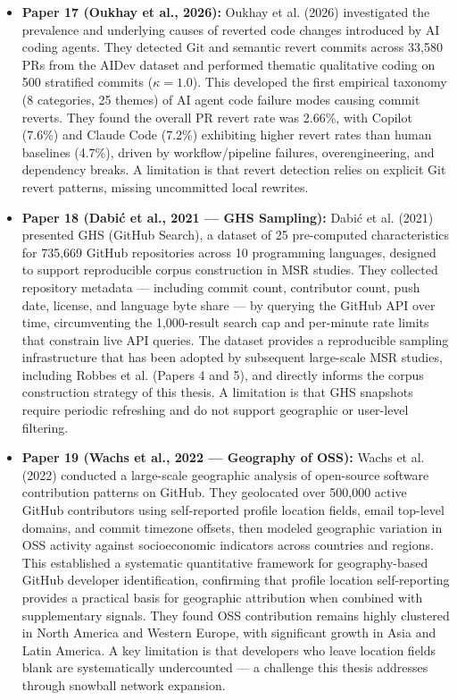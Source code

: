 \documentclass[11pt,a4paper]{article}
\begin{document}
\begin{itemize}[leftmargin=1.5em, itemsep=8pt]
    \item \textbf{Paper 17 (Oukhay et al., 2026):}
    Oukhay et al. (2026) investigated the prevalence and underlying causes of reverted code changes introduced by AI coding agents. They detected Git and semantic revert commits across 33,580 PRs from the AIDev dataset and performed thematic qualitative coding on 500 stratified commits ($\kappa = 1.0$). This developed the first empirical taxonomy (8 categories, 25 themes) of AI agent code failure modes causing commit reverts. They found the overall PR revert rate was 2.66\%, with Copilot (7.6\%) and Claude Code (7.2\%) exhibiting higher revert rates than human baselines (4.7\%), driven by workflow/pipeline failures, overengineering, and dependency breaks. A limitation is that revert detection relies on explicit Git revert patterns, missing uncommitted local rewrites.

    \item \textbf{Paper 18 (Dabi\'{c} et al., 2021 --- GHS Sampling):}
    Dabi\'{c} et al. (2021) presented GHS (GitHub Search), a dataset of 25 pre-computed characteristics for 735,669 GitHub repositories across 10 programming languages, designed to support reproducible corpus construction in MSR studies. They collected repository metadata --- including commit count, contributor count, push date, license, and language byte share --- by querying the GitHub API over time, circumventing the 1,000-result search cap and per-minute rate limits that constrain live API queries. The dataset provides a reproducible sampling infrastructure that has been adopted by subsequent large-scale MSR studies, including Robbes et al. (Papers 4 and 5), and directly informs the corpus construction strategy of this thesis. A limitation is that GHS snapshots require periodic refreshing and do not support geographic or user-level filtering.

    \item \textbf{Paper 19 (Wachs et al., 2022 --- Geography of OSS):}
    Wachs et al. (2022) conducted a large-scale geographic analysis of open-source software contribution patterns on GitHub. They geolocated over 500,000 active GitHub contributors using self-reported profile location fields, email top-level domains, and commit timezone offsets, then modeled geographic variation in OSS activity against socioeconomic indicators across countries and regions. This established a systematic quantitative framework for geography-based GitHub developer identification, confirming that profile location self-reporting provides a practical basis for geographic attribution when combined with supplementary signals. They found OSS contribution remains highly clustered in North America and Western Europe, with significant growth in Asia and Latin America. A key limitation is that developers who leave location fields blank are systematically undercounted --- a challenge this thesis addresses through snowball network expansion.


\end{itemize}
\end{document}
